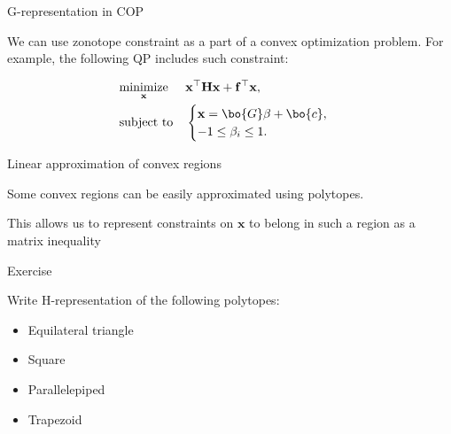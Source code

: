 \documentclass{beamer}
\begin{document}
\begin{frame}{G-representation in COP}
	\begin{flushleft}
		
		We can use zonotope constraint as a part of a convex optimization problem. For example, the following QP includes such constraint:
		
		\begin{equation}
			\begin{aligned}
				& \underset{\mathbf{x}}{\text{minimize}}
				& & \mathbf{x}^\top \mathbf{H} \mathbf{x} + \mathbf{f}^\top\mathbf{x}, \\
				& \text{subject to}
				& & \begin{cases}
					\mathbf{x} = \bo{G}\beta+\bo{c}, \\
					-1 \leq \beta_i \leq 1.
				\end{cases}
			\end{aligned}
		\end{equation}
		
	\end{flushleft}
\end{frame}




\begin{frame}{Linear approximation of convex regions}
\begin{flushleft}
Some convex regions can be easily approximated using polytopes.


%
This allows us to represent constraints on $\mathbf{x}$ to belong in such a region as a matrix inequality
 
\end{flushleft}
\end{frame}



\begin{frame}{Exercise}
\begin{flushleft}

Write H-representation of the following polytopes:

\begin{itemize}
    \item Equilateral triangle
    \item Square
    \item Parallelepiped
    \item Trapezoid
\end{itemize}

\end{flushleft}
\end{frame}
\end{document}
